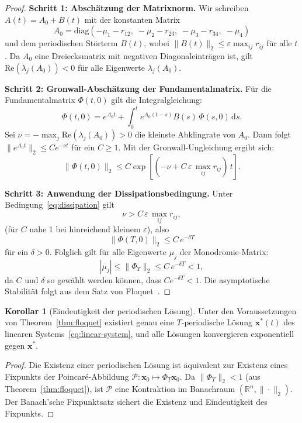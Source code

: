 ﻿\documentclass[12pt, a4paper]{article}
\theoremstyle{definition}
\newtheorem{korollar}[theorem]{Korollar}
\newcommand{\R}{\mathbb{R}}
\newcommand{\dd}{\mathrm{d}}
\begin{document}
\begin{proof}
\textbf{Schritt 1: Abschätzung der Matrixnorm.}
Wir schreiben $A(t) = A_0 + B(t)$ mit der konstanten Matrix
\[
  A_0 = \mathrm{diag}(-\mu_1 - r_{12},\; -\mu_2 - r_{23},\; -\mu_3 - r_{34},\; -\mu_4)
\]
und dem periodischen Störterm $B(t)$, wobei $\|B(t)\|_2 \leq \varepsilon \max_{ij} r_{ij}$
für alle $t$. Da $A_0$ eine Dreiecksmatrix mit negativen Diagonaleinträgen ist,
gilt $\mathrm{Re}(\lambda_j(A_0)) < 0$ für alle Eigenwerte $\lambda_j(A_0)$.

\textbf{Schritt 2: Gronwall-Abschätzung der Fundamentalmatrix.}
Für die Fundamentalmatrix $\Phi(t,0)$ gilt die Integralgleichung:
\[
  \Phi(t,0) = e^{A_0 t} + \int_0^t e^{A_0(t-s)} B(s)\,\Phi(s,0)\,\dd s.
\]
Sei $\nu = -\max_j \mathrm{Re}(\lambda_j(A_0)) > 0$ die kleinste Abklingrate
von $A_0$. Dann folgt $\|e^{A_0 t}\|_2 \leq C e^{-\nu t}$ für ein $C \geq 1$.
Mit der Gronwall-Ungleichung ergibt sich:
\[
  \|\Phi(t,0)\|_2 \leq C \exp\!\left[(-\nu + C\,\varepsilon\,\max_{ij} r_{ij})\, t\right].
\]

\textbf{Schritt 3: Anwendung der Dissipationsbedingung.}
Unter Bedingung~\eqref{eq:dissipation} gilt
\[
  \nu > C\,\varepsilon\,\max_{ij} r_{ij},
\]
(für $C$ nahe 1 bei hinreichend kleinem $\varepsilon$), also
\[
  \|\Phi(T,0)\|_2 \leq C\, e^{-\delta T}
\]
für ein $\delta > 0$. Folglich gilt für alle Eigenwerte $\mu_j$ der
Monodromie-Matrix:
\[
  |\mu_j| \leq \|\Phi_T\|_2 \leq C\, e^{-\delta T} < 1,
\]
da $C$ und $\delta$ so gewählt werden können, dass $Ce^{-\delta T} < 1$.
Die asymptotische Stabilität folgt aus dem Satz von Floquet~\cite{Floquet1883,Grimshaw1990}.
\hfill
\end{proof}

\begin{korollar}[Eindeutigkeit der periodischen Lösung]\label{cor:eindeutigkeit}
Unter den Voraussetzungen von Theorem~\ref{thm:floquet} existiert genau eine
$T$-periodische Lösung $\bm{x}^*(t)$ des linearen Systems~\eqref{eq:linear-system},
und alle Lösungen konvergieren exponentiell gegen $\bm{x}^*$.
\end{korollar}

\begin{proof}
Die Existenz einer periodischen Lösung ist äquivalent zur Existenz eines
Fixpunkts der Poincaré-Abbildung $\mathcal{P}: \bm{x}_0 \mapsto \Phi_T \bm{x}_0$.
Da $\|\Phi_T\|_2 < 1$ (aus Theorem~\ref{thm:floquet}), ist $\mathcal{P}$ eine
Kontraktion im Banachraum $(\R^n, \|\cdot\|_2)$. Der Banach'sche Fixpunktsatz
sichert die Existenz und Eindeutigkeit des Fixpunkts. \hfill
\end{proof}
\end{document}
